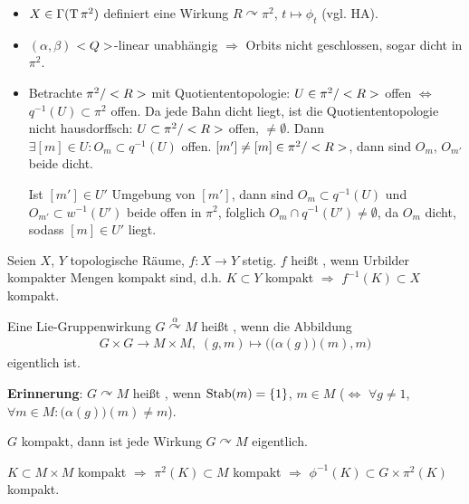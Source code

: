 \begin{example}
	\begin{itemize}
	\item $X\in\Gamma(\operatorname{T} \pi^2)$ definiert eine Wirkung $R\curvearrowright \pi^2$, $t\mapsto \phi_t$ (vgl. HA).
	\item $(\alpha,\beta)$ $<Q>$-linear unabhängig $\Rightarrow$ Orbits nicht geschlossen, sogar dicht in $\pi^2$.
	
	\item Betrachte $\pi^2\slash <R>$ mit Quotiententopologie: $U\in\pi^2\slash<R>$ offen $\Leftrightarrow$ $q^{-1}(U)\subset\pi^2$ offen. Da jede Bahn dicht liegt, ist die Quotiententopologie nicht hausdorffsch: $U\subset\pi^2\slash<R>$ offen, $\neq\emptyset$. Dann $\exists [m]\in U\colon O_m\subset q^{-1}(U)$ offen. $[m']\neq [m]\in\pi^2\slash<R>$, dann sind $O_m$, $O_{m'}$ beide dicht.
	
	Ist $[m']\in U'$ Umgebung von $[m']$, dann sind $O_{m}\subset q^{-1}(U)$ und $O_{m'}\subset w^{-1}(U')$ beide offen in $\pi^2$, folglich $O_m\cap q^{-1}(U')\neq \emptyset$, da $O_m$ dicht, sodass $[m]\in U'$ liegt.
	\end{itemize}
\end{example}

\begin{definition}
	Seien $X$, $Y$ topologische Räume, $f\colon X\to Y$ stetig. $f$ heißt , wenn Urbilder kompakter Mengen kompakt sind, d.h. $K\subset Y$ kompakt $\Rightarrow$ $f^{-1}(K)\subset X$ kompakt.
\end{definition}

\begin{definition}
	Eine Lie-Gruppenwirkung $G\overset\alpha\curvearrowright M$ heißt , wenn die Abbildung\begin{align*}
		G\times G\to M\times M,\; (g,m)\mapsto \Big(\big(\alpha(g)\big)(m),m\Big)
	\end{align*}
	eigentlich ist.
\end{definition}

\textbf{Erinnerung}: $G\curvearrowright M$ heißt , wenn $\operatorname{Stab}(m) = \{ 1 \}$, $m\in M$ ($\Leftrightarrow$ $\forall g\neq 1$, $\forall m\in M\colon \big(\alpha(g)\big)(m)\neq m$).

\begin{example}
	$G$ kompakt, dann ist jede Wirkung $G\curvearrowright M$ eigentlich.
	
	$K\subset M\times M$ kompakt $\Rightarrow$ $\pi^2(K)\subset M$ kompakt $\Rightarrow$ $\phi^{-1}(K)\subset G\times \pi^2(K)$ kompakt.
\end{example}

